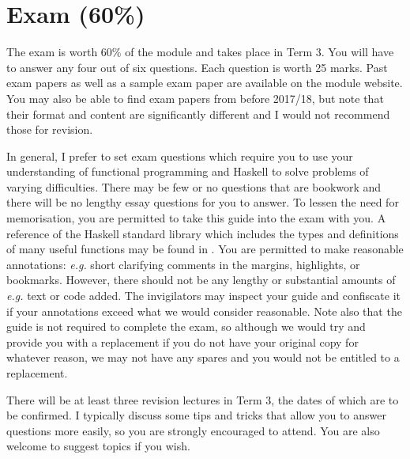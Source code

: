 \section{Exam (60\%)}

The exam is worth 60\% of the module and takes place in Term 3. You will have to answer any four out of six questions. Each question is worth 25 marks. Past exam papers as well as a sample exam paper are available on the module website. You may also be able to find exam papers from before 2017/18, but note that their format and content are significantly different and I would not recommend those for revision.

In general, I prefer to set exam questions which require you to use your understanding of functional programming and Haskell to solve problems of varying difficulties. There may be few or no questions that are bookwork and there will be no lengthy essay questions for you to answer. To lessen the need for memorisation, you are permitted to take this guide into the exam with you. A reference of the Haskell standard library which includes the types and definitions of many useful functions may be found in . You are permitted to make reasonable annotations: \emph{e.g.} short clarifying comments in the margins, highlights, or bookmarks. However, there should not be any lengthy or substantial amounts of \emph{e.g.} text or code added. The invigilators may inspect your guide and confiscate it if your annotations exceed what we would consider reasonable. Note also that the guide is not required to complete the exam, so although we would try and provide you with a replacement if you do not have your original copy for whatever reason, we may not have any spares and you would not be entitled to a replacement.

There will be at least three revision lectures in Term 3, the dates of which are to be confirmed. I typically discuss some tips and tricks that allow you to answer questions more easily, so you are strongly encouraged to attend. You are also welcome to suggest topics if you wish.